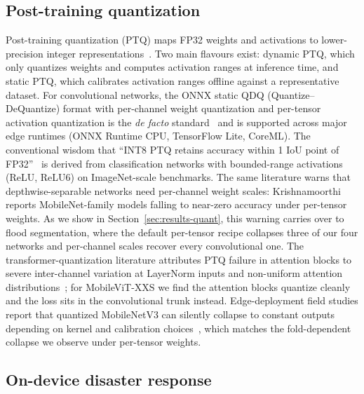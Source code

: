 \subsection{Post-training quantization}
\label{sec:rw-ptq}

Post-training quantization (PTQ) maps FP32 weights and activations to lower-precision integer representations~\cite{jacob2018quantization,krishnamoorthi2018quantizing,gholami2021quantsurvey}. Two main flavours exist: dynamic PTQ, which only quantizes weights and computes activation ranges at inference time, and static PTQ, which calibrates activation ranges offline against a representative dataset. For convolutional networks, the ONNX static QDQ (Quantize--DeQuantize) format with per-channel weight quantization and per-tensor activation quantization is the \emph{de facto} standard~\cite{ortQuant} and is supported across major edge runtimes (ONNX Runtime CPU, TensorFlow Lite, CoreML). The conventional wisdom that ``INT8 PTQ retains accuracy within 1 IoU point of FP32''~\cite{krishnamoorthi2018quantizing} is derived from classification networks with bounded-range activations (ReLU, ReLU6) on ImageNet-scale benchmarks. The same literature warns that depthwise-separable networks need per-channel weight scales: Krishnamoorthi~\cite{krishnamoorthi2018quantizing} reports MobileNet-family models falling to near-zero accuracy under per-tensor weights. As we show in Section~\ref{sec:results-quant}, this warning carries over to flood segmentation, where the default per-tensor recipe collapses three of our four networks and per-channel scales recover every convolutional one. The transformer-quantization literature attributes PTQ failure in attention blocks to severe inter-channel variation at LayerNorm inputs and non-uniform attention distributions~\cite{lin2022fqvit,li2023repqvit}; for MobileViT-XXS we find the attention blocks quantize cleanly and the loss sits in the convolutional trunk instead. Edge-deployment field studies report that quantized MobileNetV3 can silently collapse to constant outputs depending on kernel and calibration choices~\cite{qiu2022mlexray}, which matches the fold-dependent collapse we observe under per-tensor weights.

\subsection{On-device disaster response}
\label{sec:rw-ondevice}

